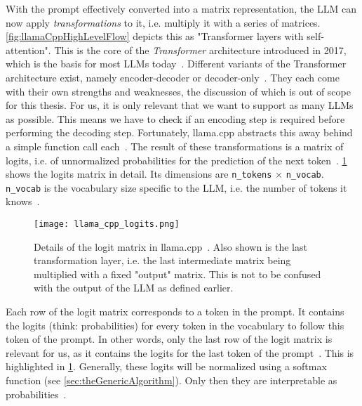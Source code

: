 With the prompt effectively converted into a matrix representation, the \gls{LLM} can now apply \textit{transformations} to it, i.e. multiply it with a series of matrices. \cref{fig:llamaCppHighLevelFlow} depicts this as "Transformer layers with self-attention". This is the core of the \textit{Transformer} architecture introduced in 2017, which is the basis for most \glspl{LLM} today~\cite{vaswaniAttentionAllYou2023}. Different variants of the Transformer architecture exist, namely encoder-decoder or decoder-only~\cite{mallisUnderstandingHowLLM2023}. They each come with their own strengths and weaknesses, the discussion of which is out of scope for this thesis. For us, it is only relevant that we want to support as many \glspl{LLM} as possible. This means we have to check if an encoding step is required before performing the decoding step. Fortunately, llama.cpp abstracts this away behind a simple function call each~\cite{gerganovGgerganovLlamacpp2024}. The result of these transformations is a matrix of logits, i.e. of unnormalized probabilities for the prediction of the next token~\cite{mallisUnderstandingHowLLM2023}. \cref{fig:llamaCppLogits} shows the logits matrix in detail. Its dimensions are \lstinline|n_tokens| $\times$ \lstinline|n_vocab|. \lstinline|n_vocab| is the vocabulary size specific to the \gls{LLM}, i.e. the number of tokens it knows~\cite{mallisUnderstandingHowLLM2023}.

\begin{figure}
    \begin{wide}
        \captionsetup{width=\linewidth}
        \texttt{[image: llama\_cpp\_logits.png]}
        \caption[llama.cpp: Logit matrix]{Details of the logit matrix in llama.cpp~\cite{mallisUnderstandingHowLLM2023}. Also shown is the last transformation layer, i.e. the last intermediate matrix being multiplied with a fixed "output" matrix. This is not to be confused with the output of the \gls{LLM} as defined earlier.}
        \label{fig:llamaCppLogits}
    \end{wide}
\end{figure}

Each row of the logit matrix corresponds to a token in the prompt. It contains the logits (think: probabilities) for every token in the vocabulary to follow this token of the prompt. In other words, only the last row of the logit matrix is relevant for us, as it contains the logits for the last token of the prompt~\cite{mallisUnderstandingHowLLM2023}. This is highlighted in \cref{fig:llamaCppLogits}. Generally, these logits will be normalized using a softmax function (see \cref{sec:theGenericAlgorithm}). Only then they are interpretable as probabilities~\cite{mallisUnderstandingHowLLM2023,turnerIntroductionTransformers2024}.

